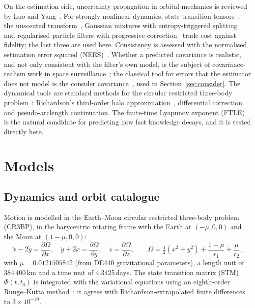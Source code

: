 \documentclass[pdflatex,sn-mathphys-num]{sn-jnl}
\begin{document}
On the estimation side, uncertainty propagation in orbital mechanics is reviewed by Luo and
Yang~\cite{luo2017}. For strongly nonlinear dynamics, state transition tensors~\cite{park2006}, the
unscented transform~\cite{julier2004,wan2000}, Gaussian mixtures with entropy-triggered
splitting~\cite{demars2013} and regularised particle filters with progressive
correction~\cite{oudjane2000,musso2001} trade cost against fidelity; the last three are used here.
Consistency is assessed with the normalised estimation error squared (NEES)~\cite{barshalom2001}.
Whether a predicted covariance is realistic, and not only consistent with the filter's own model, is
the subject of covariance-realism work in space surveillance~\cite{poore2016}; the classical tool for
errors that the estimator does not model is the consider covariance~\cite{tapley2004}, used in
Section~\ref{sec:consider}. The dynamical tools are standard methods for the circular restricted
three-body problem~\cite{szebehely1967,koon2011}: Richardson's third-order halo
approximation~\cite{richardson1980}, differential correction and pseudo-arclength continuation. The
finite-time Lyapunov exponent (FTLE)~\cite{shadden2005} is the natural candidate for predicting how fast
knowledge decays, and it is tested directly here.

\section{Models}\label{sec:models}

\subsection{Dynamics and orbit catalogue}\label{sec:dyn}
Motion is modelled in the Earth--Moon circular restricted three-body problem (CR3BP), in the
barycentric rotating frame with the Earth at $(-\mu,0,0)$ and the Moon at $(1-\mu,0,0)$:
\begin{equation}
\ddot x - 2\dot y = \frac{\partial\Omega}{\partial x},\quad
\ddot y + 2\dot x = \frac{\partial\Omega}{\partial y},\quad
\ddot z = \frac{\partial\Omega}{\partial z},\qquad
\Omega = \tfrac12(x^2+y^2) + \frac{1-\mu}{r_1} + \frac{\mu}{r_2},
\end{equation}
with $\mu = 0.0121505842$ (from DE440 gravitational parameters), a length unit of
384\,400\,km and a time unit of 4.3425\,days. The state transition matrix (STM) $\Phi(t,t_0)$ is
integrated with the variational equations using an eighth-order Runge--Kutta
method~\cite{hairer1993,virtanen2020}; it agrees with Richardson-extrapolated finite differences to
$3\times10^{-10}$.
\end{document}
